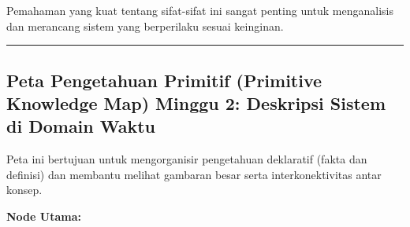 \documentclass[
  letterpaper,
  DIV=11,
  numbers=noendperiod]{scrreprt}
\begin{document}
Pemahaman yang kuat tentang sifat-sifat ini sangat penting untuk
menganalisis dan merancang sistem yang berperilaku sesuai keinginan.

\begin{center}\rule{0.5\linewidth}{0.5pt}\end{center}

\subsection{Peta Pengetahuan Primitif (Primitive Knowledge Map) Minggu
2: Deskripsi Sistem di Domain
Waktu}\label{peta-pengetahuan-primitif-primitive-knowledge-map-minggu-2-deskripsi-sistem-di-domain-waktu}

Peta ini bertujuan untuk mengorganisir pengetahuan deklaratif (fakta dan
definisi) dan membantu melihat gambaran besar serta interkonektivitas
antar konsep.

\textbf{Node Utama:}
\end{document}
